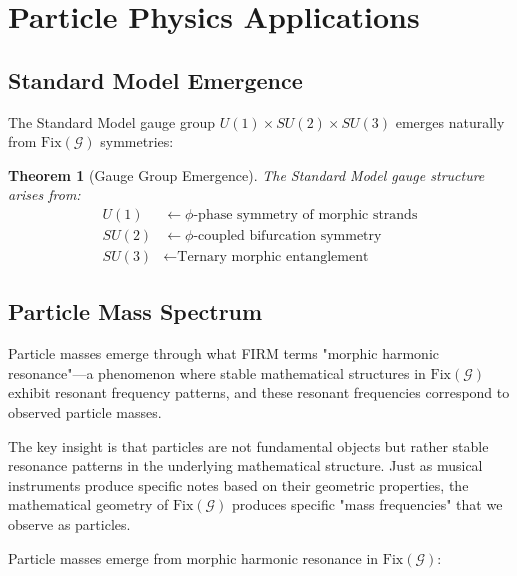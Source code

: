 \documentclass[12pt]{article}
\newcommand{\G}{\mathcal{G}}                %
\newcommand{\Fix}{\text{Fix}}               %
\newtheorem{theorem}{Theorem}
\begin{document}
\section{Particle Physics Applications}

\subsection{Standard Model Emergence}

The Standard Model gauge group $U(1) \times SU(2) \times SU(3)$ emerges naturally from $\Fix(\G)$ symmetries:

\begin{theorem}[Gauge Group Emergence]
\label{thm:gauge_groups}
The Standard Model gauge structure arises from:
\begin{align}
U(1) &\leftarrow \text{$\phi$-phase symmetry of morphic strands} \\
SU(2) &\leftarrow \text{$\phi$-coupled bifurcation symmetry} \\  
SU(3) &\leftarrow \text{Ternary morphic entanglement}
\end{align}
\end{theorem}

\subsection{Particle Mass Spectrum}

Particle masses emerge through what FIRM terms "morphic harmonic resonance"---a phenomenon where stable mathematical structures in $\Fix(\G)$ exhibit resonant frequency patterns, and these resonant frequencies correspond to observed particle masses.

The key insight is that particles are not fundamental objects but rather stable resonance patterns in the underlying mathematical structure. Just as musical instruments produce specific notes based on their geometric properties, the mathematical geometry of $\Fix(\G)$ produces specific "mass frequencies" that we observe as particles.

Particle masses emerge from morphic harmonic resonance in $\Fix(\G)$:
\end{document}
